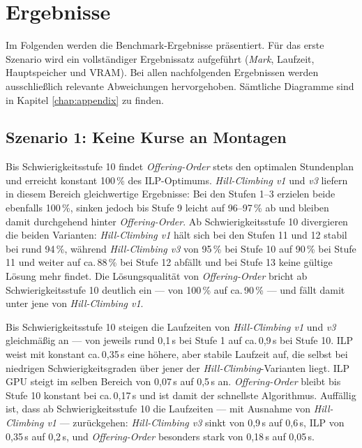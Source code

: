 \section{Ergebnisse}\label{chap:ergebnisse}

Im Folgenden werden die Benchmark-Ergebnisse präsentiert. Für das erste Szenario wird ein
vollständiger Ergebnissatz aufgeführt (\textit{Mark}, Laufzeit, Hauptspeicher und VRAM). Bei
allen nachfolgenden Ergebnissen werden ausschließlich relevante Abweichungen hervorgehoben.
Sämtliche Diagramme sind in Kapitel \ref{chap:appendix} zu finden.






\subsection{Szenario 1: Keine Kurse an Montagen}

Bis Schwierigkeitsstufe 10 findet \textit{Offering-Order} stets den optimalen Stundenplan und
erreicht konstant 100\,\% des ILP-Optimums. \textit{Hill-Climbing v1} und \textit{v3} liefern
in diesem Bereich gleichwertige Ergebnisse: Bei den Stufen 1--3 erzielen beide ebenfalls
100\,\%, sinken jedoch bis Stufe 9 leicht auf 96--97\,\% ab und bleiben damit durchgehend
hinter \textit{Offering-Order}. Ab Schwierigkeitsstufe 10 divergieren die beiden Varianten:
\textit{Hill-Climbing v1} hält sich bei den Stufen 11 und 12 stabil bei rund 94\,\%, während
\textit{Hill-Climbing v3} von 95\,\% bei Stufe 10 auf 90\,\% bei Stufe 11 und weiter auf
ca.\,88\,\% bei Stufe 12 abfällt und bei Stufe 13 keine gültige Lösung mehr findet. Die
Lösungsqualität von \textit{Offering-Order} bricht ab Schwierigkeitsstufe 10 deutlich ein ---
von 100\,\% auf ca.\,90\,\% --- und fällt damit unter jene von \textit{Hill-Climbing v1}.

\vspace{1cm}

\newpage

Bis Schwierigkeitsstufe 10 steigen die Laufzeiten von \textit{Hill-Climbing v1} und
\textit{v3} gleichmäßig an --- von jeweils rund 0{,}1\,s bei Stufe 1 auf ca.\,0{,}9\,s bei
Stufe 10. ILP weist mit konstant ca.\,0{,}35\,s eine höhere, aber stabile Laufzeit auf, die
selbst bei niedrigen Schwierigkeitsgraden über jener der \textit{Hill-Climbing}-Varianten
liegt. ILP GPU steigt im selben Bereich von 0{,}07\,s auf 0{,}5\,s an. \textit{Offering-Order}
bleibt bis Stufe 10 konstant bei ca.\,0{,}17\,s und ist damit der schnellste Algorithmus.
Auffällig ist, dass ab Schwierigkeitsstufe 10 die Laufzeiten --- mit Ausnahme von
\textit{Hill-Climbing v1} --- zurückgehen: \textit{Hill-Climbing v3} sinkt von 0{,}9\,s auf
0{,}6\,s, ILP von 0{,}35\,s auf 0{,}2\,s, und \textit{Offering-Order} besonders stark von
0{,}18\,s auf 0{,}05\,s.

